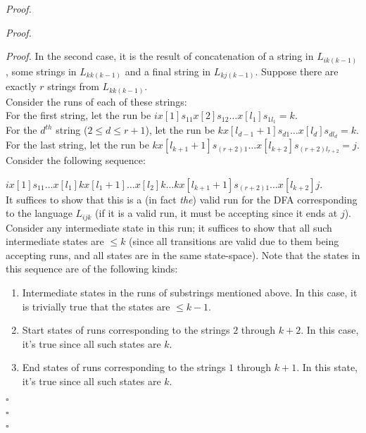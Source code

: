 \documentclass[a4paper]{article}
\newenvironment{proof}{\begin{breakbox}\textit{Proof.}}{\hfill$\square$\end{breakbox}}
\begin{document}
\begin{proof}
\begin{proof}
\begin{enumerate}
\begin{proof}
                        In the second case, it is the result of concatenation of a string in $L_{ik(k-1)}$, some strings in $L_{kk(k-1)}$ and a final string in $L_{kj(k-1)}$. Suppose there are
                        exactly $r$ strings from $L_{kk(k-1)}$.\\

                        Consider the runs of each of these strings:\\

                        For the first string, let the run be $i x[1] s_{11} x[2] s_{12} \ldots x[l_1] s_{1l_1} = k$.\\

                        For the $d^{th}$ string ($2 \le d \le r + 1$), let the run be $k x[l_{d-1} + 1] s_{d1} \ldots x[l_d] s_{dl_d} = k$.\\

                        For the last string, let the run be $k x[l_{k+1}+1] s_{(r+2)1} \ldots x[l_{k+2}] s_{(r+2)l_{r+2}} = j$.\\

                        Consider the following sequence:

                        $i x[1] s_{11} \ldots x[l_1] k x[l_1+1] \ldots x[l_2] k \ldots k x[l_{k+1}+1] s_{(r+2)1} \ldots x[l_{k+2}] j$.\\

                        It suffices to show that this is a (in fact \textit{the}) valid run for the DFA corresponding to the language $L_{ijk}$ (if it is a valid run, it must be accepting since it ends at $j$).\\

                        Consider any intermediate state in this run; it suffices to show that all such intermediate states are $\le k$ (since all transitions are valid due to them being
                        accepting runs, and all states are in the same state-space). Note that the states in this sequence are of the following kinds:

                        \begin{enumerate}
                            \item Intermediate states in the runs of substrings mentioned above.
                                In this case, it is trivially true that the states are $\le k - 1$.
                            \item Start states of runs corresponding to the strings $2$ through $k+2$. In this case, it's true since all such states are $k$.
                            \item End states of runs corresponding to the strings $1$ through $k+1$. In this state, it's true since all such states are $k$.
                        \end{enumerate}


\end{proof}
\end{enumerate}
\end{proof}
\end{proof}
\end{document}
